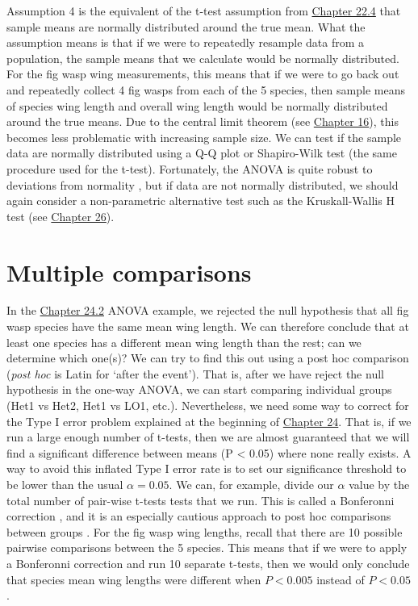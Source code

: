 \documentclass[
  openany]{scrbook}
\begin{document}
Assumption 4 is the equivalent of the t-test assumption from \protect\hyperlink{assumptions-of-t-tests}{Chapter 22.4} that sample means are normally distributed around the true mean.
What the assumption means is that if we were to repeatedly resample data from a population, the sample means that we calculate would be normally distributed.
For the fig wasp wing measurements, this means that if we were to go back out and repeatedly collect 4 fig wasps from each of the 5 species, then sample means of species wing length and overall wing length would be normally distributed around the true means.
Due to the central limit theorem (see \protect\hyperlink{Chapter_16}{Chapter 16}), this becomes less problematic with increasing sample size.
We can test if the sample data are normally distributed using a Q-Q plot or Shapiro-Wilk test (the same procedure used for the t-test).
Fortunately, the ANOVA is quite robust to deviations from normality \citep{Schmider2010}, but if data are not normally distributed, we should again consider a non-parametric alternative test such as the Kruskall-Wallis H test (see \protect\hyperlink{Chapter_26}{Chapter 26}).

\hypertarget{Chapter_25}{%
\chapter{Multiple comparisons}\label{Chapter_25}}

In the \protect\hyperlink{one-way-anova}{Chapter 24.2} ANOVA example, we rejected the null hypothesis that all fig wasp species have the same mean wing length.
We can therefore conclude that at least one species has a different mean wing length than the rest; can we determine which one(s)?
We can try to find this out using a post hoc comparison (\emph{post hoc} is Latin for `after the event').
That is, after we have reject the null hypothesis in the one-way ANOVA, we can start comparing individual groups (Het1 vs Het2, Het1 vs LO1, etc.).
Nevertheless, we need some way to correct for the Type I error problem explained at the beginning of \protect\hyperlink{Chapter_24}{Chapter 24}.
That is, if we run a large enough number of t-tests, then we are almost guaranteed that we will find a significant difference between means (P \textless{} 0.05) where none really exists.
A way to avoid this inflated Type I error rate is to set our significance threshold to be lower than the usual \(\alpha = 0.05\).
We can, for example, divide our \(\alpha\) value by the total number of pair-wise t-tests tests that we run.
This is called a Bonferonni correction \citep{Dytham2011}, and it is an especially cautious approach to post hoc comparisons between groups \citep{Narum2006}.
For the fig wasp wing lengths, recall that there are 10 possible pairwise comparisons between the 5 species.
This means that if we were to apply a Bonferonni correction and run 10 separate t-tests, then we would only conclude that species mean wing lengths were different when \(P < 0.005\) instead of \(P < 0.05\).
\end{document}
